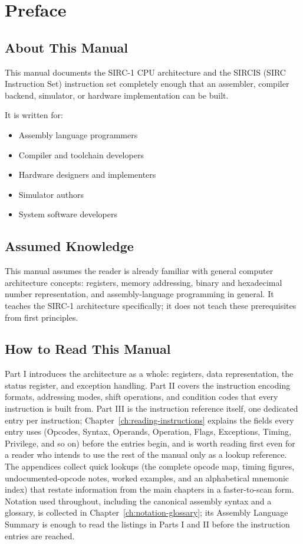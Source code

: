 \chapter*{Preface}
\label{ch:preface}

\section*{About This Manual}

This manual documents the SIRC-1 CPU architecture and the SIRCIS (SIRC Instruction Set) instruction set completely
enough that an assembler, compiler backend, simulator, or hardware implementation can be built.

It is written for:

\begin{itemize}
	\item Assembly language programmers
	\item Compiler and toolchain developers
	\item Hardware designers and implementers
	\item Simulator authors
	\item System software developers
\end{itemize}

\section*{Assumed Knowledge}

This manual assumes the reader is already familiar with general computer architecture concepts: registers, memory
addressing, binary and hexadecimal number representation, and assembly-language programming in general. It teaches the
SIRC-1 architecture specifically; it does not teach these prerequisites from first principles.

\section*{How to Read This Manual}

Part I introduces the architecture as a whole: registers, data representation, the status register, and exception
handling. Part II covers the instruction encoding formats, addressing modes, shift operations, and condition codes that
every instruction is built from. Part III is the instruction reference itself, one dedicated entry per instruction;
Chapter~\ref{ch:reading-instructions} explains the fields every entry uses (Opcodes, Syntax, Operands, Operation,
Flags, Exceptions, Timing, Privilege, and so on) before the entries begin, and is worth reading first even for a reader
who intends to use the rest of the manual only as a lookup reference. The appendices collect quick lookups (the
complete opcode map, timing figures, undocumented-opcode notes, worked examples, and an alphabetical mnemonic index)
that restate information from the main chapters in a faster-to-scan form. Notation used throughout, including the
canonical assembly syntax and a glossary, is collected in Chapter~\ref{ch:notation-glossary}; its Assembly Language
Summary is enough to read the listings in Parts I and II before the instruction entries are reached.


